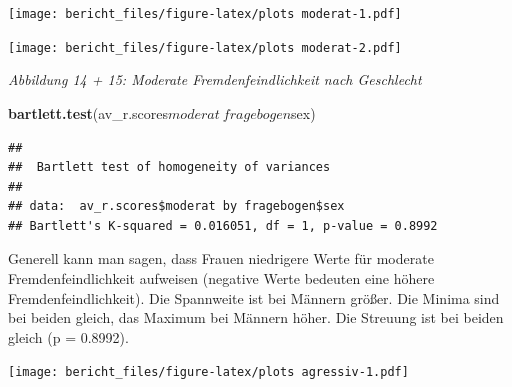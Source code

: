 \documentclass[]{article}
\newenvironment{Shaded}{\begin{snugshade}}{\end{snugshade}}
\newcommand{\KeywordTok}[1]{\textcolor[rgb]{0.13,0.29,0.53}{\textbf{{#1}}}}
\newcommand{\DataTypeTok}[1]{\textcolor[rgb]{0.13,0.29,0.53}{{#1}}}
\newcommand{\StringTok}[1]{\textcolor[rgb]{0.31,0.60,0.02}{{#1}}}
\newcommand{\NormalTok}[1]{{#1}}
\begin{document}
\texttt{[image: bericht\_files/figure-latex/plots moderat-1.pdf]}

\begin{Shaded}
\end{Shaded}

\texttt{[image: bericht\_files/figure-latex/plots moderat-2.pdf]}

\begin{center}
\textit{Abbildung 14 + 15: Moderate Fremdenfeindlichkeit nach Geschlecht}
\bigskip
\end{center}

\begin{Shaded}
\begin{Highlighting}[]
\KeywordTok{bartlett.test}\NormalTok{(av_r.scores$moderat~fragebogen$sex)}
\end{Highlighting}
\end{Shaded}

\begin{verbatim}
## 
##  Bartlett test of homogeneity of variances
## 
## data:  av_r.scores$moderat by fragebogen$sex
## Bartlett's K-squared = 0.016051, df = 1, p-value = 0.8992
\end{verbatim}

Generell kann man sagen, dass Frauen niedrigere Werte für moderate
Fremdenfeindlichkeit aufweisen (negative Werte bedeuten eine höhere
Fremdenfeindlichkeit). Die Spannweite ist bei Männern größer. Die Minima
sind bei beiden gleich, das Maximum bei Männern höher. Die Streuung ist
bei beiden gleich (p = 0.8992).

\begin{Shaded}
\end{Shaded}

\texttt{[image: bericht\_files/figure-latex/plots agressiv-1.pdf]}
\end{document}
